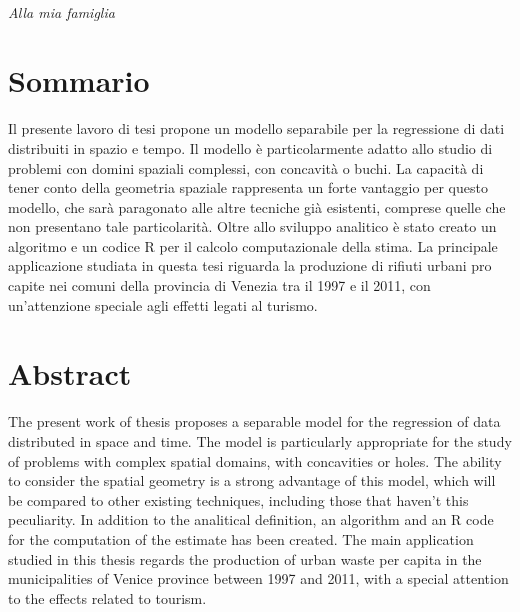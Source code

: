 \documentclass[a4paper,11pt,twoside,openright]{book}							%
\begin{document}
\newpage
\thispagestyle{empty}
\ \ \ 
\newpage
\thispagestyle{empty}
\ 
\newline
\newline
\newline
\newline
\newline

\begin{flushright}
\large{\textit{Alla mia famiglia}}
\end{flushright}
\newpage
\thispagestyle{empty}

\chapter*{Sommario}
\label{Cap:sommario}
\thispagestyle{empty}
Il presente lavoro di tesi propone un modello separabile per la regressione di dati distribuiti in spazio e tempo. Il modello è particolarmente adatto allo studio di problemi con domini spaziali complessi, con concavità o buchi. La capacità di tener conto della geometria spaziale rappresenta un forte vantaggio per questo modello, che sarà paragonato alle altre tecniche già esistenti, comprese quelle che non presentano tale particolarità. Oltre allo sviluppo analitico è stato creato un algoritmo e un codice R per il calcolo computazionale della stima. La principale applicazione studiata in questa tesi riguarda la produzione di rifiuti urbani pro capite nei comuni della provincia di Venezia tra il 1997 e il 2011, con un'attenzione speciale agli effetti legati al turismo.

\newpage
\thispagestyle{empty}
\chapter*{Abstract}
\label{Cap:abstract}
\thispagestyle{empty}
The present work of thesis proposes a separable model for the regression of data distributed in space and time. The model is particularly appropriate for the study of problems with complex spatial domains, with concavities or holes. The ability to consider the spatial geometry is a strong advantage of this model, which will be compared to other existing techniques, including those that haven't this peculiarity. In addition to the analitical definition, an algorithm and an R code for the computation of the estimate has been created. The main application studied in this thesis regards the production of urban waste per capita in the municipalities of Venice province between 1997 and 2011, with a special attention to the effects related to tourism.
\newpage
\thispagestyle{empty}
\end{document}
